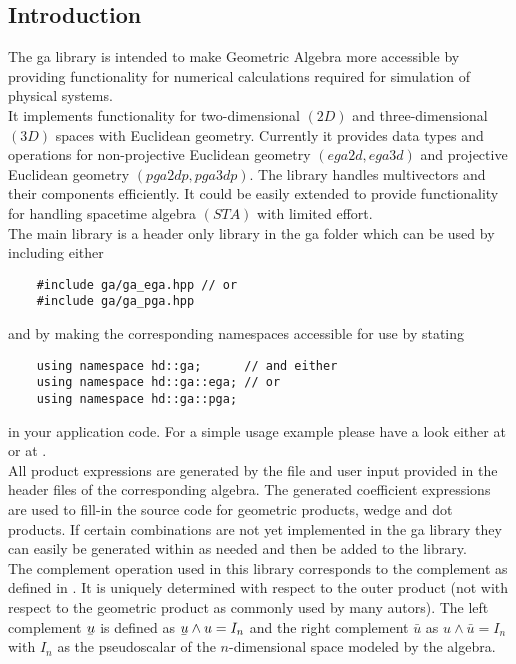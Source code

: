 \subsection{Introduction}
\label{intro}

The ga library is intended to make Geometric Algebra more accessible by providing
functionality for numerical calculations required for simulation of physical systems.
\\

It implements functionality for two-dimensional $(2D)$ and three-dimensional $(3D)$ spaces
with Euclidean geometry. Currently it provides data types and operations for
non-projective Euclidean geometry $(ega2d, ega3d)$ and projective Euclidean geometry
$(pga2dp, pga3dp)$. The library handles multivectors and their components efficiently. It
could be easily extended to provide functionality for handling spacetime algebra $(STA)$
with limited effort.
\\

The main library is a header only library in the ga folder which can be used by including
either
\begin{verbatim}
    #include ga/ga_ega.hpp // or
    #include ga/ga_pga.hpp
\end{verbatim}
and by making the corresponding namespaces accessible for use by stating
\begin{verbatim}
    using namespace hd::ga;      // and either
    using namespace hd::ga::ega; // or
    using namespace hd::ga::pga;
\end{verbatim}
in your application code. For a simple usage example please have a look either at
 or at .
\\

All product expressions are generated by the file  and
user input provided in the header files of the corresponding algebra. The generated
coefficient expressions are used to fill-in the source code for geometric products, wedge
and dot products. If certain combinations are not yet implemented in the ga library they
can easily be generated within  as needed and then be added to the
library.
\\

The complement operation used in this library corresponds to the complement as defined in
\cite{Lengyel_pga-illuminated:2024}. It is uniquely determined with respect to the outer
product (not with respect to the geometric product as commonly used by many autors). The
left complement $\ubar{u}$ is defined as $\ubar{u} \wedge u = I_n$ and the right
complement $\bar{u}$ as $u \wedge \bar{u} = I_n$ with $I_n$ as the pseudoscalar of the
$n$-dimensional space modeled by the algebra.
\\

